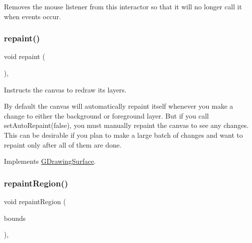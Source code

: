 Removes the mouse listener from this interactor so that it will no longer call it when events occur. 

\mbox{\label{classGCanvas_afb8dbc55702230f0030e47d6c009697f}} 
\subsubsection{\texorpdfstring{repaint()}{repaint()}}
{\footnotesize\ttfamily void repaint (\begin{DoxyParamCaption}{ }\end{DoxyParamCaption})\hspace{0.3cm}{\ttfamily [override]}, {\ttfamily [virtual]}}



Instructs the canvas to redraw its layers. 

By default the canvas will automatically repaint itself whenever you make a change to either the background or foreground layer. But if you call set\+Auto\+Repaint(false), you must manually repaint the canvas to see any changes. This can be desirable if you plan to make a large batch of changes and want to repaint only after all of them are done. 

Implements \mbox{\hyperlink{classGDrawingSurface_a4a8ae47b42f1e6a41b65d3546df46218}{G\+Drawing\+Surface}}.

\mbox{\label{classGDrawingSurface_a769c46fb3e1004aec76e8b0adfa42aa6}} 
\subsubsection{\texorpdfstring{repaint\+Region()}{repaintRegion()}\hspace{0.1cm}{\footnotesize\ttfamily [1/2]}}
{\footnotesize\ttfamily void repaint\+Region (\begin{DoxyParamCaption}\item[{const \mbox{\hyperlink{structGRectangle}{G\+Rectangle}} \&}]{bounds }\end{DoxyParamCaption})\hspace{0.3cm}{\ttfamily [virtual]}, {\ttfamily [inherited]}}



